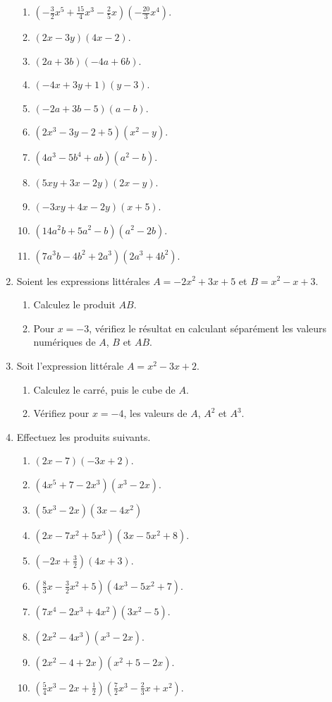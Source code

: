 \documentclass[12 pt]{extarticle}
\theoremstyle{plain}
\begin{document}
\begin{enumerate}
\begin{enumerate}
\item $\left(-\frac32x^5+\frac{15}4x^3-\frac25x\right)\left(-\frac{20}3x^4\right)$.
\item $(2x-3y)(4x-2)$.
\item $(2a+3b)(-4a+6b)$.
\item $(-4x+3y+1)(y-3)$. 
\item $(-2a+3b-5)(a-b)$. 
\item $(2x^3-3y-2+5)(x^2-y)$.
\item $(4a^3-5b^4+ab)(a^2-b)$.
\item $(5xy+3x-2y)(2x-y)$.
\item $(-3xy+4x-2y)(x+5)$.
\item $(14a^2b+5a^2-b)(a^2-2b)$.
\item $(7a^3b-4b^2+2a^3)(2a^3+4b^2)$. 
\end{enumerate}
\item Soient les expressions littérales $A=-2x^2+3x+5$ et $B=x^2-x+3$. 
\begin{enumerate}
\item Calculez le produit $AB$. 
\item Pour $x=-3$, vérifiez le résultat en calculant séparément les valeurs numériques de $A$, $B$ et $AB$. 
\end{enumerate}
\item Soit l'expression littérale $A= x^2-3x+2$. \begin{enumerate}
\item Calculez le carré, puis le cube de $A$. 
\item Vérifiez pour $x=-4$, les valeurs de $A$, $A^2$ et $A^3$. 
\end{enumerate}
\item Effectuez les produits suivants.
\begin{enumerate}
\item $(2x-7)(-3x+2)$.
\item $(4x^5+7-2x^3)(x^3-2x)$.
\item $(5x^3-2x)(3x-4x^2)$
\item $(2x-7x^2+5x^3)(3x-5x^2+8)$.
\item $\left(-2x+\frac32\right)(4x+3)$.
\item $\left(\frac83x-\frac32x^2+5\right)(4x^3-5x^2+7)$.
\item $(7x^4-2x^3+4x^2)(3x^2-5)$.
\item $(2x^2-4x^3)(x^3-2x)$.
\item $(2x^2-4+2x)(x^2+5-2x)$.
\item $\left(\frac54x^3-2x+\frac12\right)\left(\frac72x^3-\frac23x+x^2\right)$.

\end{enumerate}
\end{enumerate}
\end{document}
